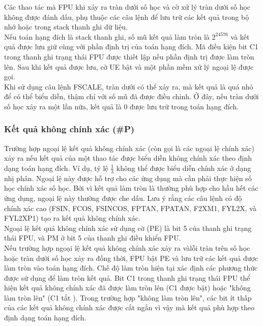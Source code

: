 		Các thao tác mà FPU khi xảy ra tràn dưới số học và cờ xử lý tràn dưới số học không được đánh dấu, phụ thuộc các câu lệnh để lưu trữ các kết quả trong bộ nhớ hoặc trong stack thanh ghi dữ liệu.\\
		
		Nếu toán hạng đích là stack thanh ghi, số mũ kết quả làm tròn là $2^{24576}$ và kết quả được lưu giữ cùng với phần định trị của toán hạng đích. Mã điều kiện bit C1 trong thanh ghi trạng thái FPU được thiết lập nếu phần định trị được làm tròn lên. Sau khi kết quả được lưu, cờ UE bật và một phần mềm xử lý ngoại lệ được gọi.\\
		
		Khi sử dụng câu lệnh FSCALE, tràn dưới  có thể xảy ra, mà kết quả là quá nhỏ để có thể biểu diễn, thậm chí với số mũ đã được điều chỉnh. Ở đây, nếu tràn dưới số học xảy ra một lần nữa, kết quả là 0 được lưu trữ trong toán hạng đích.
			
		\subsubsection*{Kết quả không chính xác (\#P)} 
		Trường hợp ngoại lệ kết quả không chính xác (còn gọi là các ngoại lệ chính xác) xảy ra nếu kết quả của một thao tác được biểu diễn không chính xác theo định dạng toán hạng đích. Ví dụ, tỷ lệ $\frac{1}{3}$ không thể được biểu diễn chính xác ở dạng nhị phân. Ngoại lệ này được hỗ trợ cho các ứng dụng mà cần phải thực hiện số học chính xác số học. Bởi vì kết quả làm tròn là thường phù hợp cho hầu hết các ứng dụng, ngoại lệ này thường được che dấu. Lưu ý rằng các câu lệnh có độ chính xác cao (FSIN, FCOS, FSINCOS, FPTAN, FPATAN, F2XM1, FYL2X, và FYL2XP1) tạo ra kết quả không chính xác.\\
		
		Ngoại lệ kết quả không chính xác sử dụng cờ (PE) là bit 5 của thanh ghi trạng thái FPU, và PM ở bit 5 của thanh ghi điều khiển FPU.\\
		
		Nếu trường hợp ngoại lệ kết quả không chính xác xảy ra vàlỗi tràn trên số học hoặc tràn dưới số học xảy ra đồng thời, FPU bật PE và lưu trữ các kết quả được làm tròn vào toán hạng đích. Chế độ làm tròn hiện tại xác định các phương thức được sử dụng để làm tròn kết quả. Bit C1 trong thanh ghi trạng thái FPU thể hiện kết quả không chính xác đã được làm tròn lên (C1 được bật) hoặc "không làm tròn lên" (C1 tắt ). Trong trường hợp "không làm tròn lên", các bit ít thấp của các kết quả không chính xác được cắt ngắn vì vậy mà kết quả phù hợp theo định dạng toán hạng đích.\\
		
